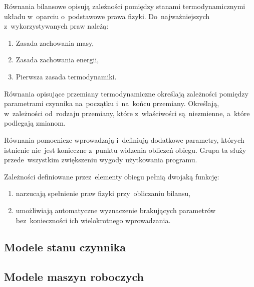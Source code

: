 Równania bilansowe opisują zależności pomiędzy stanami termodynamicznymi
układu w~oparciu o~podstawowe prawa fizyki. Do~najważniejszych
z~wykorzystywanych praw należą:

\begin{enumerate}

	\item Zasada zachowania masy,

	\item Zasada zachowania energii,

	\item Pierwsza zasada termodynamiki.

\end{enumerate}

Równania opisujące przemiany termodynamiczne określają zależności
pomiędzy parametrami czynnika na~początku i~na~końcu przemiany.
Określają, w~zależności od~rodzaju przemiany, które z~właściwości
są~niezmienne, a~które podlegają zmianom.

Równania pomocnicze wprowadzają i~definiują dodatkowe parametry, których
istnienie nie~jest konieczne z~punktu widzenia obliczeń obiegu. Grupa ta
służy przede~wszystkim zwiększeniu wygody użytkowania programu.

Zależności definiowane przez~elementy obiegu pełnią dwojaką funkcję:

\begin{enumerate}

	\item narzucają spełnienie praw fizyki przy~obliczaniu bilansu,

	\item umożliwiają automatyczne wyznaczenie brakujących parametrów
		bez~konieczności ich wielokrotnego wprowadzania.

\end{enumerate}


\subsection{Modele stanu czynnika}





\subsection{Modele maszyn roboczych}

\newcommand\wykresTs[2][]{
	\subfloat[][Wykres T-s przemiany]{
		\begin{tikzpicture}
			\begin{axis}[
				xtick=\empty,
				ytick=\empty,
				axis lines=left,
				ylabel=T,
				xlabel=s,
				height=5cm,
				clip=false,
				every axis x label/.style={at={(xticklabel cs:.95,.2cm)}},
				every axis y label/.style={at={(yticklabel cs:.9,.2cm)}},
				#1
			]
				\addplot+[no marks, smooth] table[x=s, y=T] {wykresy/_nasyc.txt};
				#2
			\end{axis}
		\end{tikzpicture}
	}
}





